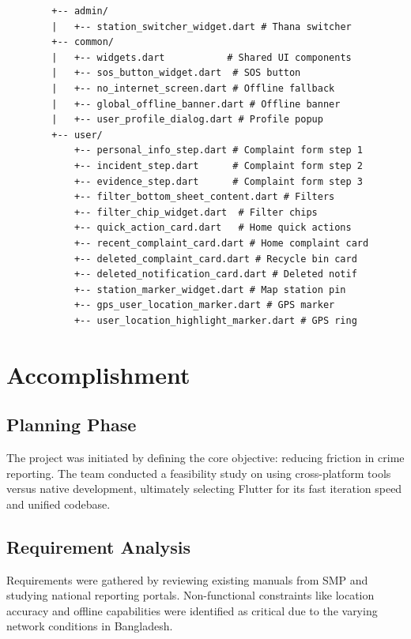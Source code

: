 \documentclass[11pt, a4paper]{report}
\begin{document}
\begin{verbatim}
        +-- admin/
        |   +-- station_switcher_widget.dart # Thana switcher
        +-- common/
        |   +-- widgets.dart           # Shared UI components
        |   +-- sos_button_widget.dart  # SOS button
        |   +-- no_internet_screen.dart # Offline fallback
        |   +-- global_offline_banner.dart # Offline banner
        |   +-- user_profile_dialog.dart # Profile popup
        +-- user/
            +-- personal_info_step.dart # Complaint form step 1
            +-- incident_step.dart      # Complaint form step 2
            +-- evidence_step.dart      # Complaint form step 3
            +-- filter_bottom_sheet_content.dart # Filters
            +-- filter_chip_widget.dart  # Filter chips
            +-- quick_action_card.dart   # Home quick actions
            +-- recent_complaint_card.dart # Home complaint card
            +-- deleted_complaint_card.dart # Recycle bin card
            +-- deleted_notification_card.dart # Deleted notif
            +-- station_marker_widget.dart # Map station pin
            +-- gps_user_location_marker.dart # GPS marker
            +-- user_location_highlight_marker.dart # GPS ring
\end{verbatim}

\chapter{Accomplishment}

\section{Planning Phase}
The project was initiated by defining the core objective: reducing friction in crime reporting. The team conducted a feasibility study on using cross-platform tools versus native development, ultimately selecting Flutter for its fast iteration speed and unified codebase.

\section{Requirement Analysis}
Requirements were gathered by reviewing existing manuals from SMP and studying national reporting portals. Non-functional constraints like location accuracy and offline capabilities were identified as critical due to the varying network conditions in Bangladesh.
\end{document}
